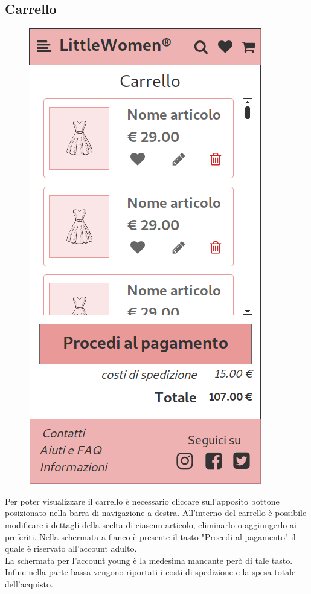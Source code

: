 \documentclass[12pt,a4paper]{report}
\begin{document}
\subsection{Carrello}
\begin{figure}
\centering
\includegraphics[height=0.4\textheight]{"Project Management Sources/Wireframe/WireFrame Screenshot/Mobile/Carrello"}
\vspace{-50pt}
\end{figure}
Per poter visualizzare il carrello è necessario cliccare sull'apposito bottone posizionato nella barra di navigazione a destra. All'interno del carrello è possibile modificare i dettagli della scelta di ciascun articolo, eliminarlo o aggiungerlo ai preferiti. Nella schermata a fianco è presente il tasto "Procedi al pagamento" il quale è riservato all'account adulto. \\La schermata per l'account young è la medesima mancante però di tale tasto. Infine nella parte bassa vengono riportati i costi di spedizione e la spesa totale dell'acquisto.\\
\end{document}
